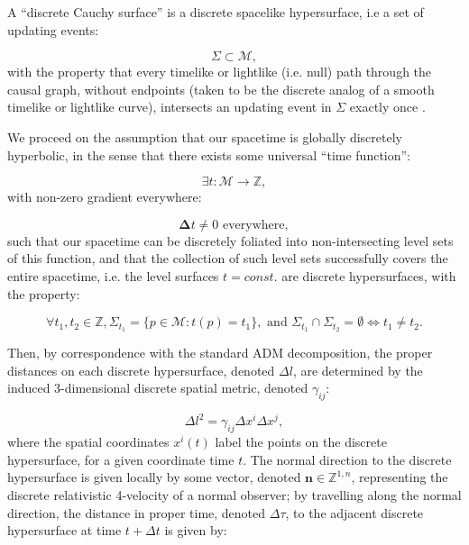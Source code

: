 \documentclass{article}
\begin{document}
\begin{definition}
A ``discrete Cauchy surface'' is a discrete spacelike hypersurface, i.e a set of updating events:

\begin{equation}
\Sigma \subset \mathcal{M},
\end{equation}
with the property that every timelike or lightlike (i.e. null) path through the causal graph, without endpoints (taken to be the discrete analog of a smooth timelike or lightlike curve), intersects an updating event in  ${\Sigma}$ exactly once .
\end{definition}

We proceed on the assumption that our spacetime is globally discretely hyperbolic, in the sense that there exists some universal ``time function'':

\begin{equation}
\exists t : \mathcal{M} \to \mathbb{Z},
\end{equation}
with non-zero gradient everywhere:

\begin{equation}
\mathbf{\Delta} t \neq 0 \text{ everywhere},
\end{equation}
such that our spacetime can be discretely foliated into non-intersecting level sets of this function, and that the collection of such level sets successfully covers the entire spacetime, i.e. the level surfaces ${t = const.}$ are discrete hypersurfaces, with the property:

\begin{equation}
\forall t_1, t_2 \in \mathbb{Z}, \Sigma_{t_1} = \lbrace p \in \mathcal{M} : t (p) = t_1 \rbrace, \text{ and } \Sigma_{t_1} \cap \Sigma_{t_2} = \emptyset \iff t_1 \neq t_2.
\end{equation}

Then, by correspondence with the standard ADM decomposition, the proper distances on each discrete hypersurface, denoted ${\Delta l}$, are determined by the induced 3-dimensional discrete spatial metric, denoted ${\gamma_{i j}}$:

\begin{equation}
\Delta l^2 = \gamma_{i j} \Delta x^i \Delta x^j,
\end{equation}
where the spatial coordinates ${x^i \left( t \right)}$ label the points on the discrete hypersurface, for a given coordinate time $t$. The normal direction to the discrete hypersurface is given locally by some vector, denoted ${\mathbf{n} \in \mathbb{Z}^{1, n}}$, representing the discrete relativistic 4-velocity of a normal observer; by travelling along the normal direction, the distance in proper time, denoted ${\Delta \tau}$, to the adjacent discrete hypersurface at time ${t + \Delta t}$ is given by:
\end{document}
